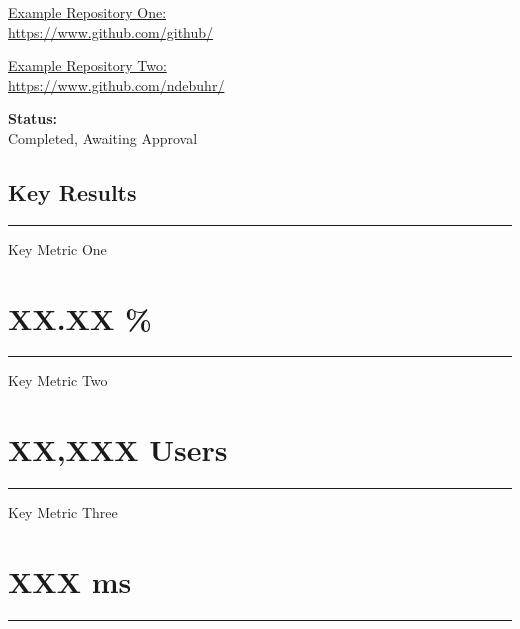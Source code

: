 \documentclass{LeanTestReport}
\begin{document}
\begin{minipage}[t]{0.55\linewidth}
\begin{flushleft}
\href{https://www.github.com/github/}{Example Repository One:}
\\
\href{https://www.github.com/github/}{https://www.github.com/github/}
\medskip
 
\href{https://www.github.com/ndebuhr/}{Example Repository Two:}
\\
\href{https://www.github.com/ndebuhr/}{https://www.github.com/ndebuhr/}
\medskip 

\end{flushleft}



\end{minipage} \hspace{0.25in}%
\begin{minipage}[t]{0.4\linewidth}
\vspace{-0.24in}
\begin{mybox}
\textbf{Status:}\\
Completed, Awaiting Approval
\end{mybox}

\subsection*{Key Results}

\begin{center}
\rule{\textwidth}{1pt}%
\vspace{0.22in}
Key Metric One \\
\section*{XX.XX \%}
\rule{\textwidth}{1pt}%
\vspace{0.22in}
Key Metric Two \\
\section*{XX,XXX Users}
\rule{\textwidth}{1pt}%
\vspace{0.22in}
Key Metric Three \\
\section*{XXX ms}
\rule{\textwidth}{1pt}
\end{center}

\vfill
\end{minipage}
\newpage
\setlength{\leftskip}{0in} %
\restoregeometry %
\end{document}
